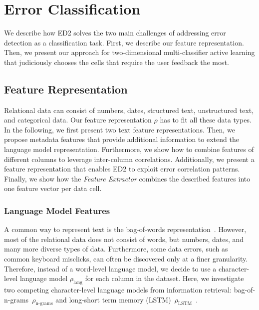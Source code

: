 \section{Error Classification}
\label{sec:system_all}
We describe how ED2 solves the two main challenges of addressing error detection as a classification task. First, we describe our feature representation. Then, we present our approach for two-dimensional multi-classifier active learning that judiciously chooses the cells that require the user feedback the most. 

\subsection{Feature Representation}
\label{sec:features}
Relational data can consist of numbers, dates, structured text, unstructured text, and categorical data. Our feature representation $\rho$ has to fit all these data types. In the following, we first present two text feature representations. Then, we propose metadata features that provide additional information to extend the language model representation. Furthermore, we show how to combine features of different columns to leverage inter-column correlations. Additionally, we present a feature representation that enables ED2 to exploit error correlation patterns. Finally, we show how the \emph{Feature Extractor} combines the described features into one feature vector per data cell.

\subsubsection{Language Model Features}
A common way to represent text is the bag-of-words representation~\cite{harris1954distributional}. However, most of the relational data does not consist of words, but numbers, dates, and many more diverse types of data. Furthermore, some data errors, such as common keyboard misclicks, can often be discovered only at a finer granularity.
Therefore, instead of a word-level language model, we decide to use a character-level language model $\rho_{\text{lang}}$ for each column in the dataset.
Here, we investigate two competing character-level language models from information retrieval: bag-of-n-grams~$\rho_{\text{n-grams}}$ and long-short term memory (LSTM)~$\rho_{\text{LSTM}}$~\cite{cavnar1994n,hochreiter1997long}. 

